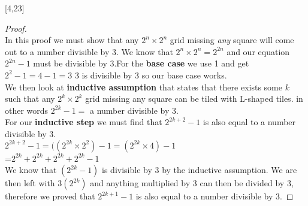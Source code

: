 \documentclass[12pt,letterpaper]{exam}
\begin{document}
[4,23]
\begin{proof}
\\
In this proof we must show that any  $2^n \times 2^n$ grid missing \emph{any} square will come out to a number divisible by 3. We know that  $2^n \times 2^n=2^{2n}$ and our equation $2^{2n}-1$ must be divisible by 3.For the \textbf{base case} we use 1 and get $2^{2}-1=4-1=3$ 3 is divisible by 3 so our base case works.
\\
We then look at \textbf{inductive assumption} that states that there exists some $k$ such that any $2^k \times 2^k$ grid missing any square can be tiled with L-shaped tiles. in other words $2^{2k}-1=$ a number divisible by 3.
\\
For our \textbf{inductive step} we must find that $2^{2k+2}-1$ is also equal to a number divisible by 3. 
\\
$2^{2k+2}-1= ((2^{2k} \times 2^2) -1 = (2^{2k} \times 4) -1 $\\
=$2^{2k}+2^{2k}+2^{2k}+2^{2k} -1$\\
We know that $(2^{2k}-1)$ is divisible by 3 by the inductive assumption. We are then left with $3(2^{2k})$ and anything multiplied by 3 can then be divided by 3, therefore we proved that $2^{2k+1}-1$ is also equal to a number divisible by 3. 
\end{proof}
\end{document}
